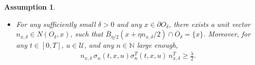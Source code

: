 \documentclass[amscd,amssymb,11pt]{article}
\newtheorem{assumption}[theorem]{Assumption}
\numberwithin{theorem}{section}
\numberwithin{equation}{section}
\begin{document}
\begin{assumption}
\begin{itemize}
\begin{align*}
    \left\|D_{x}\Gamma_{n}\right\|_{L^{\infty}(\overline{Q^{0}}\times\mathcal{U})}\cdot\max\left(\left\|b-b_{n}\right\|_{L^{\infty}( \overline{Q^{0}}\times\mathcal{U})},\,\left\|\sigma-\sigma_{n}\right\|_{L^{\infty}( \overline{Q^{0}}\times\mathcal{U})}\right)=o_{1/n}(1),\quad\\
    \left\|D_{x}\Gamma_{n}\right\|_{L^{\infty}(\overline{Q^{0}}\times\mathcal{U})}\left(\int_{\mathbb{R}^{m_{2}}_{0}}\left\|\gamma(\cdot,\cdot,\cdot,z)-\gamma_{n}(\cdot,\cdot,\cdot,z)\right\|_{L^\infty(\overline{Q^{0}}\times\mathcal{U})}^{2}\nu(dz)\right)^{1/2}=o_{1/n}(1).
    \end{align*}
\item [(iii)] For any sufficiently small $\delta>0$ and any $x\in\partial O_{\delta}$, there exists a unit vector $n_{x,\delta}\in N(O_{\delta},x)$, such that $\overline{B}_{\eta/2}(x+\eta n_{x,\delta}/2)\cap\overline{O}_{\delta}=\{x\}$. Moreover, for any $t\in[0,T]$, $u\in\mathcal{U}$, and any $n\in\mathbb{N}$ large enough,
    \begin{align*}
    n_{x,\delta}\,\sigma_{n}(t,x,u)\sigma_{n}^{T}(t,x,u)\,n_{x,\delta}^{T}\geq\frac{\lambda}{2}.
    \end{align*}
\end{itemize}
\end{assumption}
\end{document}
